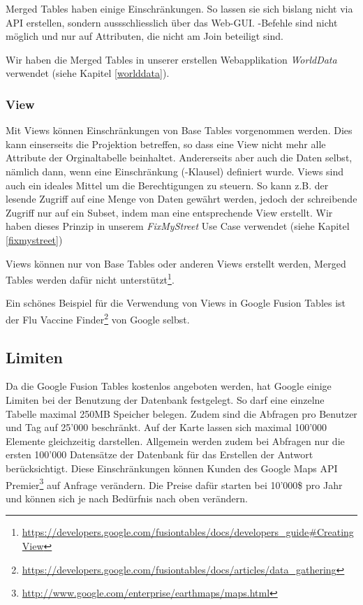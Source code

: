 Merged Tables haben einige Einschränkungen. So lassen sie sich bislang nicht via API erstellen, sondern aussschliesslich über das Web-GUI. -Befehle sind nicht möglich und  nur auf Attributen, die nicht am Join beteiligt sind.

Wir haben die Merged Tables in unserer erstellen Webapplikation \emph{WorldData} verwendet (siehe Kapitel \ref{worlddata}).

\subsubsection{View}
Mit Views können Einschränkungen von Base Tables vorgenommen werden. Dies kann einserseits die Projektion betreffen, so dass eine View nicht mehr alle Attribute der Orginaltabelle beinhaltet. Andererseits aber auch die Daten selbst, nämlich dann, wenn eine Einschränkung (-Klausel) definiert wurde. Views sind auch ein ideales Mittel um die Berechtigungen zu steuern. So kann z.B. der lesende Zugriff auf eine Menge von Daten gewährt werden, jedoch der schreibende Zugriff nur auf ein Subset, indem man eine entsprechende View erstellt. Wir haben dieses Prinzip in unserem \emph{FixMyStreet} Use Case verwendet (siehe Kapitel \ref{fixmystreet})

Views können nur von Base Tables oder anderen Views erstellt werden, Merged Tables werden dafür nicht unterstützt\footnote{\url{https://developers.google.com/fusiontables/docs/developers_guide\#CreatingView}}.

Ein schönes Beispiel für die Verwendung von Views in Google Fusion Tables ist der Flu Vaccine Finder\footnote{\url{https://developers.google.com/fusiontables/docs/articles/data_gathering}} von Google selbst.

\subsection{Limiten}
Da die Google Fusion Tables kostenlos angeboten werden, hat Google einige Limiten bei der Benutzung der Datenbank festgelegt. So darf eine einzelne Tabelle maximal 250MB Speicher belegen. Zudem sind die Abfragen pro Benutzer und Tag auf 25'000 beschränkt. Auf der Karte lassen sich maximal 100'000 Elemente gleichzeitig darstellen. Allgemein werden zudem bei Abfragen nur die ersten 100'000 Datensätze der Datenbank für das Erstellen der Antwort berücksichtigt. Diese Einschränkungen können Kunden des Google Maps API Premier\footnote{\url{http://www.google.com/enterprise/earthmaps/maps.html}} auf Anfrage verändern. Die Preise dafür starten bei 10'000\$ pro Jahr und können sich je nach Bedürfnis nach oben verändern.\cite{fusion-tables-geo-limits}

